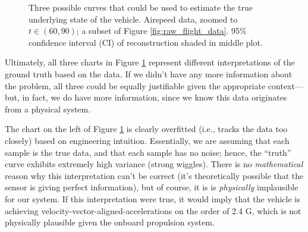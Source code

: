 \documentclass[conf]{new-aiaa}
\begin{document}
    \begin{figure}[H]
        \centering
        \caption{Three possible curves that could be used to estimate the true underlying state of the vehicle. Airspeed data, zoomed to $t \in (60, 90)$; a subset of Figure \ref{fig:raw_flight_data}. 95\% confidence interval (CI) of reconstruction shaded in middle plot.}
        \label{fig:under_over_fitting}
    \end{figure}

    Ultimately, all three charts in Figure \ref{fig:under_over_fitting} represent different interpretations of the ground truth based on the data. If we didn't have any more information about the problem, all three could be equally justifiable given the appropriate context—but, in fact, we do have more information, since we know this data originates from a physical system.

    The chart on the left of Figure \ref{fig:under_over_fitting} is clearly overfitted (i.e., tracks the data too closely) based on engineering intuition. Essentially, we are assuming that each sample is the true data, and that each sample has no noise; hence, the ``truth'' curve exhibits extremely high variance (strong wiggles). There is no \emph{mathematical} reason why this interpretation can't be correct (it's theoretically possible that the sensor is giving perfect information), but of course, it is is \emph{physically} implausible for our system. If this interpretation were true, it would imply that the vehicle is achieving velocity-vector-aligned-accelerations on the order of 2.4 G, which is not physically plausible given the onboard propulsion system.
\end{document}
